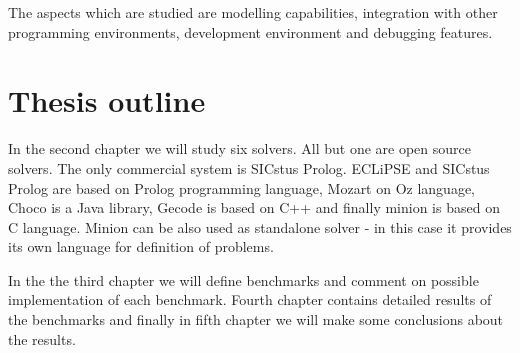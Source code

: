 The aspects which are studied are modelling capabilities, integration with other 
programming environments, development environment and debugging features. 

\section{Thesis outline}

In the second chapter we will study six solvers. All but one are open source solvers. 
The only commercial system is SICstus Prolog. ECLiPSE and SICstus Prolog are based on Prolog
programming language, Mozart on Oz language, Choco is a Java library, Gecode is based on C++ and finally 
minion is based on C language. Minion can be also used as standalone solver - in this 
case it provides its own language for definition of problems.

In the the third chapter we will define benchmarks and comment on possible 
implementation of each benchmark. Fourth chapter contains detailed results of 
the benchmarks and finally in fifth chapter we will make some conclusions about 
the results.
